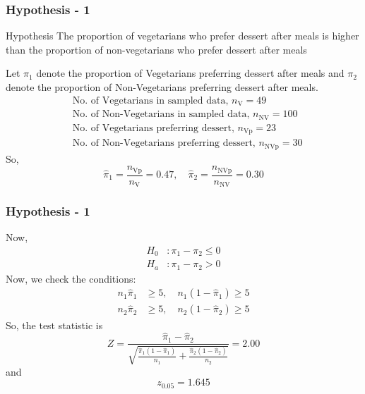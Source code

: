 \documentclass{beamer}
\begin{document}
\begin{frame}
    \frametitle{Hypothesis - 1}
    \begin{block}{Hypothesis}
        The proportion of vegetarians who prefer dessert after meals is higher than the proportion of non-vegetarians who prefer dessert after meals
    \end{block}
    Let $\pi_1$ denote the proportion of Vegetarians preferring dessert after meals and $\pi_2$ denote the proportion of Non-Vegetarians preferring dessert after meals.
    \begin{align}
        &\text{No. of Vegetarians in sampled data, } n_{\text{V}} = 49 \\
        &\text{No. of Non-Vegetarians in sampled data, } n_{\text{NV}} = 100 \\
        &\text{No. of Vegetarians preferring dessert, } n_{\text{Vp}} = 23 \\
        &\text{No. of Non-Vegetarians preferring dessert, } n_{\text{NVp}} = 30
    \end{align}
    So,
    \begin{equation}
        \hat{\pi}_1 = \frac{n_{\text{Vp}}}{n_{\text{V}}} = 0.47, \quad \hat{\pi}_2 = \frac{n_{\text{NVp}}}{n_{\text{NV}}} = 0.30
    \end{equation}
\end{frame}
\begin{frame}
    \frametitle{Hypothesis - 1}
    Now,
    \begin{align}
        H_0 &: \pi_1 - \pi_2 \leq 0 \\
        H_a &: \pi_1 - \pi_2 > 0
    \end{align}
    Now, we check the conditions:
    \begin{align}
        n_1\hat{\pi}_1 &\geq 5, \quad n_1(1 - \hat{\pi}_1) \geq 5 \\
        n_2\hat{\pi}_2 &\geq 5, \quad n_2(1 - \hat{\pi}_2) \geq 5
    \end{align}
    So, the test statistic is
    \begin{equation}
        Z = \frac{\hat{\pi}_1 - \hat{\pi}_2}{\sqrt{\frac{\hat{\pi}_1(1-\hat{\pi}_1)}{n_1} + \frac{\hat{\pi}_2(1-\hat{\pi}_2)}{n_2}}} = 2.00
    \end{equation}
    and
    \begin{equation}
        z_{0.05} = 1.645
    \end{equation}
\end{frame}
\end{document}
